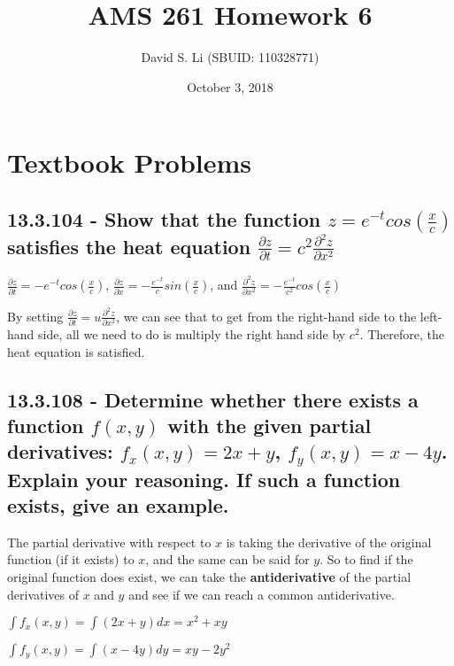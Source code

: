 \documentclass{article}
\title{AMS 261 Homework 6}
\author{David S. Li (SBUID: 110328771)}
\date{October 3, 2018}
\begin{document}
\maketitle

\section{Textbook Problems}
\subsection{13.3.104 - Show that the function $z = e^{-t}cos(\frac{x}{c})$ satisfies the heat equation $\frac{\partial z}{\partial t} = c^{2}\frac{\partial^{2}z}{\partial x^{2}}$}

\par\noindent\large $\frac{\partial z}{\partial t} = -e^{-t}cos(\frac{x}{c})$, $\frac{\partial z}{\partial x} = -\frac{e^{-t}}{c}sin(\frac{x}{c})$, and $\frac{\partial^{2}z}{\partial x^{2}} = -\frac{e^{-t}}{c^{2}}cos(\frac{x}{c})$\vspace{0.25cm}

\par\noindent\large By setting $\frac{\partial z}{\partial t} = u\frac{\partial^{2}z}{\partial x^{2}}$, we can see that to get from the right-hand side to the left-hand side, all we need to do is multiply the right hand side by $c^{2}$.  Therefore, the heat equation is satisfied.

\subsection{13.3.108 - Determine whether there exists a function $f(x, y)$ with the given partial derivatives: $f_{x}(x, y) = 2x + y$, $f_{y}(x, y) = x - 4y$.  Explain your reasoning.  If such a function exists, give an example.}

\par\noindent\large The partial derivative with respect to $x$ is taking the derivative of the original function (if it exists) to $x$, and the same can be said for $y$.  So to find if the original function does exist, we can take the \textbf{antiderivative} of the partial derivatives of $x$ and $y$ and see if we can reach a common antiderivative.\vspace{0.25cm}

\par\noindent\large $\int f_{x}(x, y) = \int (2x + y)dx = x^{2} + xy$
\par\noindent\large $\int f_{y}(x, y) = \int (x - 4y)dy = xy - 2y^{2}$\vspace{0.25cm}
\end{document}
